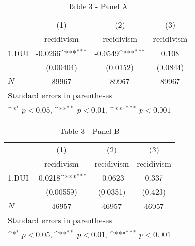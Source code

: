 \documentclass{book}
\begin{document}
\begin{table}[htbp]\centering
\def\sym#1{\ifmmode^{#1}\else\(^{#1}\)\fi}
\caption{Table 3 - Panel A}
\begin{tabular}{l*{3}{c}}
\hline\hline
            &\multicolumn{1}{c}{(1)}&\multicolumn{1}{c}{(2)}&\multicolumn{1}{c}{(3)}\\
            &\multicolumn{1}{c}{recidivism}&\multicolumn{1}{c}{recidivism}&\multicolumn{1}{c}{recidivism}\\
\hline
1.DUI       &     -0.0266\sym{***}&     -0.0549\sym{***}&       0.108         \\
            &   (0.00404)         &    (0.0152)         &    (0.0844)         \\
\hline
\(N\)       &       89967         &       89967         &       89967         \\
\hline\hline
\multicolumn{4}{l}{\footnotesize Standard errors in parentheses}\\
\multicolumn{4}{l}{\footnotesize \sym{*} \(p<0.05\), \sym{**} \(p<0.01\), \sym{***} \(p<0.001\)}\\
\end{tabular}
\end{table}


\begin{table}[htbp]\centering
\def\sym#1{\ifmmode^{#1}\else\(^{#1}\)\fi}
\caption{Table 3 - Panel B}
\begin{tabular}{l*{3}{c}}
\hline\hline
            &\multicolumn{1}{c}{(1)}&\multicolumn{1}{c}{(2)}&\multicolumn{1}{c}{(3)}\\
            &\multicolumn{1}{c}{recidivism}&\multicolumn{1}{c}{recidivism}&\multicolumn{1}{c}{recidivism}\\
\hline
1.DUI       &     -0.0218\sym{***}&     -0.0623         &       0.337         \\
            &   (0.00559)         &    (0.0351)         &     (0.423)         \\
\hline
\(N\)       &       46957         &       46957         &       46957         \\
\hline\hline
\multicolumn{4}{l}{\footnotesize Standard errors in parentheses}\\
\multicolumn{4}{l}{\footnotesize \sym{*} \(p<0.05\), \sym{**} \(p<0.01\), \sym{***} \(p<0.001\)}\\
\end{tabular}
\end{table}
\end{document}
